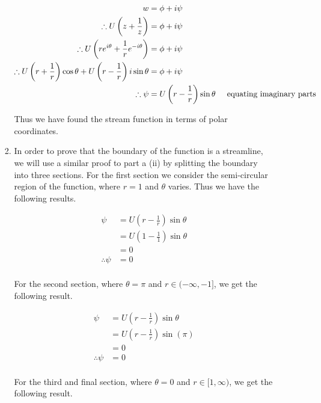 \documentclass[a4paper]{article}
\begin{document}
\begin{enumerate}[label=\textbf{\arabic*.}]
\begin{enumerate}
\begin{enumerate}
			\begin{align*}
			w & = \phi +i\psi\\
			\therefore U\left(z + \frac{1}{z}\right) & = \phi +i\psi\\
			\therefore U\left(re^{i\theta} + \frac{1}{r}e^{-i\theta}\right) & = \phi +i\psi\\
			\therefore U\left(r + \frac{1}{r}\right)\cos\theta + U\left(r - \frac{1}{r}\right)i\sin\theta & = \phi +i\psi\\
			\therefore \psi & = U\left(r - \frac{1}{r}\right)\sin\theta \hspace{5mm} \text{equating imaginary parts}\\
			\end{align*}

			Thus we have found the stream function in terms of polar coordinates.

			\bigbreak

			\item In order to prove that the boundary of the function is a streamline, we will use a similar proof to part a (ii) by splitting the boundary into three sections. For the first section we consider the semi-circular region of the function, where $\displaystyle{r=1}$ and $\displaystyle{\theta}$ varies. Thus we have the following results.

			\begin{align*}
			\psi & = U\left(r - \frac{1}{r}\right)\sin\theta\\
			& = U\left(1 - \frac{1}{1}\right)\sin\theta\\
			& = 0\\
			\therefore \psi & = 0\\
			\end{align*}

			For the second section, where $\displaystyle{\theta = \pi}$ and $\displaystyle{r \in (-\infty,-1]}$, we get the following result.

			\begin{align*}
			\psi & = U\left(r - \frac{1}{r}\right)\sin\theta\\
			& = U\left(r - \frac{1}{r}\right)\sin(\pi)\\
			& = 0\\
			\therefore \psi & = 0\\
			\end{align*}

			For the third and final section, where $\displaystyle{\theta = 0}$ and $\displaystyle{r \in [1,\infty)}$, we get the following result.


\end{enumerate}
\end{enumerate}
\end{enumerate}
\end{document}
